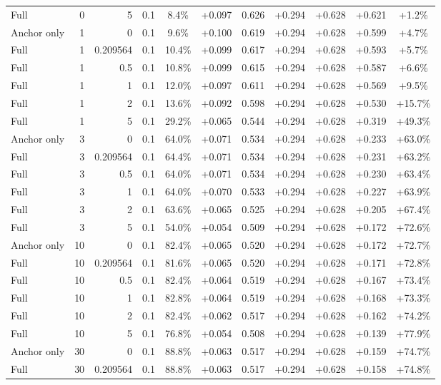 \begin{table}[htbp]
\begin{tabular}{lrrrccccccc}
Full & 0 & 5 & 0.1 & 8.4\% & +0.097 & 0.626 & +0.294 & +0.628 & +0.621 & +1.2\% \\
Anchor only & 1 & 0 & 0.1 & 9.6\% & +0.100 & 0.619 & +0.294 & +0.628 & +0.599 & +4.7\% \\
Full & 1 & 0.209564 & 0.1 & 10.4\% & +0.099 & 0.617 & +0.294 & +0.628 & +0.593 & +5.7\% \\
Full & 1 & 0.5 & 0.1 & 10.8\% & +0.099 & 0.615 & +0.294 & +0.628 & +0.587 & +6.6\% \\
Full & 1 & 1 & 0.1 & 12.0\% & +0.097 & 0.611 & +0.294 & +0.628 & +0.569 & +9.5\% \\
Full & 1 & 2 & 0.1 & 13.6\% & +0.092 & 0.598 & +0.294 & +0.628 & +0.530 & +15.7\% \\
Full & 1 & 5 & 0.1 & 29.2\% & +0.065 & 0.544 & +0.294 & +0.628 & +0.319 & +49.3\% \\
Anchor only & 3 & 0 & 0.1 & 64.0\% & +0.071 & 0.534 & +0.294 & +0.628 & +0.233 & +63.0\% \\
Full & 3 & 0.209564 & 0.1 & 64.4\% & +0.071 & 0.534 & +0.294 & +0.628 & +0.231 & +63.2\% \\
Full & 3 & 0.5 & 0.1 & 64.0\% & +0.071 & 0.534 & +0.294 & +0.628 & +0.230 & +63.4\% \\
Full & 3 & 1 & 0.1 & 64.0\% & +0.070 & 0.533 & +0.294 & +0.628 & +0.227 & +63.9\% \\
Full & 3 & 2 & 0.1 & 63.6\% & +0.065 & 0.525 & +0.294 & +0.628 & +0.205 & +67.4\% \\
Full & 3 & 5 & 0.1 & 54.0\% & +0.054 & 0.509 & +0.294 & +0.628 & +0.172 & +72.6\% \\
Anchor only & 10 & 0 & 0.1 & 82.4\% & +0.065 & 0.520 & +0.294 & +0.628 & +0.172 & +72.7\% \\
Full & 10 & 0.209564 & 0.1 & 81.6\% & +0.065 & 0.520 & +0.294 & +0.628 & +0.171 & +72.8\% \\
Full & 10 & 0.5 & 0.1 & 82.4\% & +0.064 & 0.519 & +0.294 & +0.628 & +0.167 & +73.4\% \\
Full & 10 & 1 & 0.1 & 82.8\% & +0.064 & 0.519 & +0.294 & +0.628 & +0.168 & +73.3\% \\
Full & 10 & 2 & 0.1 & 82.4\% & +0.062 & 0.517 & +0.294 & +0.628 & +0.162 & +74.2\% \\
Full & 10 & 5 & 0.1 & 76.8\% & +0.054 & 0.508 & +0.294 & +0.628 & +0.139 & +77.9\% \\
Anchor only & 30 & 0 & 0.1 & 88.8\% & +0.063 & 0.517 & +0.294 & +0.628 & +0.159 & +74.7\% \\
Full & 30 & 0.209564 & 0.1 & 88.8\% & +0.063 & 0.517 & +0.294 & +0.628 & +0.158 & +74.8\% \\

\end{tabular}
\end{table}
